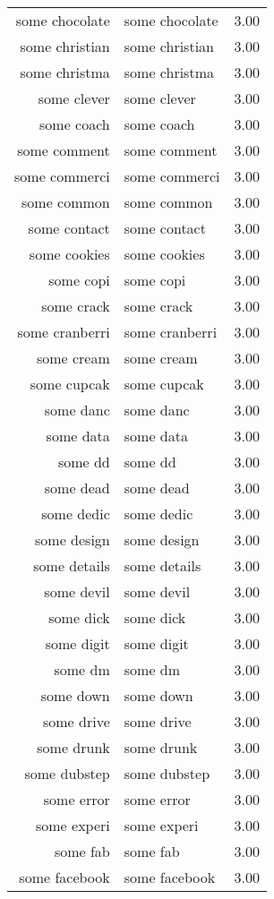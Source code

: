\begin{table}[ht]
\begin{tabular}{rlr}
  some chocolate & some chocolate & 3.00 \\ 
  some christian & some christian & 3.00 \\ 
  some christma & some christma & 3.00 \\ 
  some clever & some clever & 3.00 \\ 
  some coach & some coach & 3.00 \\ 
  some comment & some comment & 3.00 \\ 
  some commerci & some commerci & 3.00 \\ 
  some common & some common & 3.00 \\ 
  some contact & some contact & 3.00 \\ 
  some cookies & some cookies & 3.00 \\ 
  some copi & some copi & 3.00 \\ 
  some crack & some crack & 3.00 \\ 
  some cranberri & some cranberri & 3.00 \\ 
  some cream & some cream & 3.00 \\ 
  some cupcak & some cupcak & 3.00 \\ 
  some danc & some danc & 3.00 \\ 
  some data & some data & 3.00 \\ 
  some dd & some dd & 3.00 \\ 
  some dead & some dead & 3.00 \\ 
  some dedic & some dedic & 3.00 \\ 
  some design & some design & 3.00 \\ 
  some details & some details & 3.00 \\ 
  some devil & some devil & 3.00 \\ 
  some dick & some dick & 3.00 \\ 
  some digit & some digit & 3.00 \\ 
  some dm & some dm & 3.00 \\ 
  some down & some down & 3.00 \\ 
  some drive & some drive & 3.00 \\ 
  some drunk & some drunk & 3.00 \\ 
  some dubstep & some dubstep & 3.00 \\ 
  some error & some error & 3.00 \\ 
  some experi & some experi & 3.00 \\ 
  some fab & some fab & 3.00 \\ 
  some facebook & some facebook & 3.00 \\ 

\end{tabular}
\end{table}
